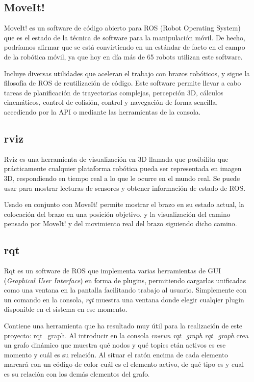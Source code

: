 \subsection{MoveIt!}
\label{subsec:plat_moveit}

MoveIt!\cite{moveit}  es un software de código abierto para ROS (Robot Operating System) que es el estado de la técnica de software para la manipulación móvil. De hecho, podríamos afirmar que se está convirtiendo en un estándar de facto en el campo de la robótica móvil, ya que hoy en día más de 65 robots utilizan este software.

Incluye diversas utilidades que aceleran el trabajo con brazos robóticos, y sigue la filosofía de ROS de reutilización de código. Este software permite llevar a cabo tareas de planificación de trayectorias complejas, percepción 3D, cálculos cinemáticos, control de colisión, control y navegación de forma sencilla, accediendo por la API o mediante las herramientas de la consola.


\subsection{rviz}
\label{subsec:plat_rviz}

Rviz\cite{rviz} es una herramienta de visualización en 3D llamada que posibilita que  prácticamente cualquier plataforma robótica pueda ser representada en imagen 3D, respondiendo en tiempo real a lo que le ocurre en el mundo real. Se puede usar para mostrar lecturas de sensores y obtener información de estado de ROS.

Usado en conjunto con MoveIt! permite mostrar el brazo en su estado actual, la colocación del brazo en una posición objetivo, y la visualización del camino pensado por MoveIt! y del movimiento real del brazo siguiendo dicho camino.

\subsection{rqt}
\label{subsec:plat_rqt}

Rqt\cite{rqt} es un software de ROS que implementa varias herramientas de GUI (\textit{Graphical User Interface}) en forma de plugins, permitiendo cargarlas unificadas como una ventana en la pantalla facilitando trabajo al usuario. Simplemente con un comando en la consola, \textit{rqt} muestra una ventana donde elegir cualqier plugin disponible en el sistema en ese momento.

Contiene una herramienta que ha resultado muy útil para la realización de este proyecto: rqt\_graph. Al introducir en la consola \textit{rosrun rqt\_graph rqt\_graph} crea un grafo dinámico que muestra qué nodos y qué topics etán activos es ese momento y cuál es su relación. Al situar el ratón encima de cada elemento marcará con un código de color cuál es el elemento activo, de qué tipo es y cual es su relación con los demás elementos del grafo.



